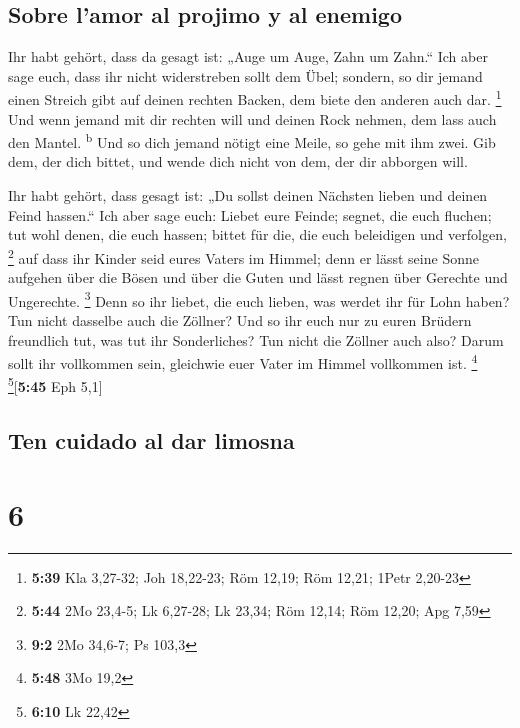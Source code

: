\hypertarget{sobre-lamor-al-projimo-y-al-enemigo}{%
\subsection{Sobre l'amor al projimo y al
enemigo}\label{sobre-lamor-al-projimo-y-al-enemigo}}

 Ihr habt gehört, dass da gesagt ist: „Auge um Auge, Zahn
um Zahn.``  Ich aber sage euch, dass ihr nicht
widerstreben sollt dem Übel; sondern, so dir jemand einen Streich gibt
auf deinen rechten Backen, dem biete den anderen auch dar. \footnote{\textbf{5:39}
  Kla 3,27-32; Joh 18,22-23; Röm 12,19; Röm 12,21; 1Petr 2,20-23}
 Und wenn jemand mit dir rechten will und deinen Rock
nehmen, dem lass auch den Mantel. \textsuperscript{b} 
Und so dich jemand nötigt eine Meile, so gehe mit ihm zwei.
 Gib dem, der dich bittet, und wende dich nicht von dem,
der dir abborgen will.

 Ihr habt gehört, dass gesagt ist: „Du sollst deinen
Nächsten lieben und deinen Feind hassen.``  Ich aber sage
euch: Liebet eure Feinde; segnet, die euch fluchen; tut wohl denen, die
euch hassen; bittet für die, die euch beleidigen und verfolgen,
\footnote{\textbf{5:44} 2Mo 23,4-5; Lk 6,27-28; Lk 23,34; Röm 12,14; Röm
  12,20; Apg 7,59}  auf dass ihr Kinder seid eures Vaters
im Himmel; denn er lässt seine Sonne aufgehen über die Bösen und über
die Guten und lässt regnen über Gerechte und Ungerechte. \footnote{\textbf{9:2}
  2Mo 34,6-7; Ps 103,3}  Denn so ihr liebet, die euch
lieben, was werdet ihr für Lohn haben? Tun nicht dasselbe auch die
Zöllner?  Und so ihr euch nur zu euren Brüdern freundlich
tut, was tut ihr Sonderliches? Tun nicht die Zöllner auch also?
 Darum sollt ihr vollkommen sein, gleichwie euer Vater im
Himmel vollkommen ist. \footnote{\textbf{5:48} 3Mo 19,2}
\footnote{\textbf{6:10} Lk 22,42}{[}\textbf{5:45} Eph 5,1{]}

\hypertarget{ten-cuidado-al-dar-limosna}{%
\subsection{Ten cuidado al dar
limosna}\label{ten-cuidado-al-dar-limosna}}

\hypertarget{section-5}{%
\section{6}\label{section-5}}

